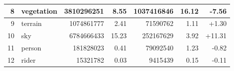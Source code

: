 \documentclass[a4paper,12pt]{report}
\begin{document}
\begin{table}[]
{\begin{tabular}{|r|l|r|r|r|r|r|}
            8                                                                                      & vegetation    & 3810296251                          & 8.55                                                                                   & 1037416846                                                                            & 16.12                                                                                       & -7.56                                                                                          \\ \hline
            9                                                                                      & terrain       & 1074861777                          & 2.41                                                                                   & 71590762                                                                              & 1.11                                                                                        & +1.30                                                                                          \\ \hline
            10                                                                                     & sky           & 6784666433                          & 15.23                                                                                  & 252167629                                                                             & 3.92                                                                                        & +11.31                                                                                         \\ \hline
            11                                                                                     & person        & 181828023                           & 0.41                                                                                   & 79092540                                                                              & 1.23                                                                                        & -0.82                                                                                          \\ \hline
            12                                                                                     & rider         & 15321782                            & 0.03                                                                                   & 9415439                                                                               & 0.15                                                                                        & -0.11                                                                                          \\ \hline

\end{tabular}}
\end{table}
\end{document}
